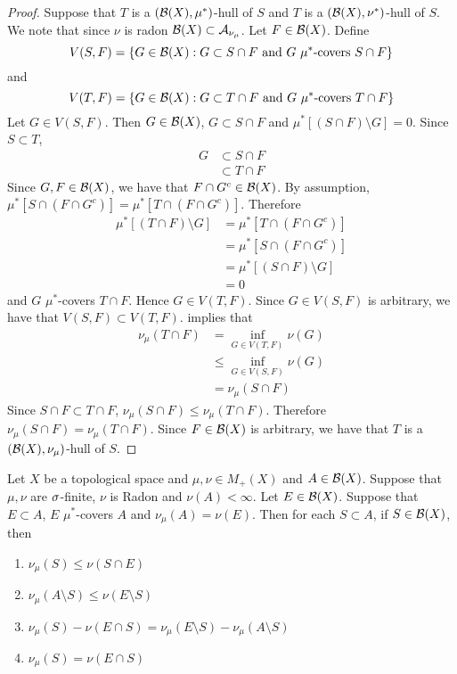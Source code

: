 \documentclass{book}
\begin{document}
	\begin{proof}
		Suppose that $T$ is a $(\mathcal{B}(X), \mu^*)$-hull of $S$ and $T$ is a $(\mathcal{B}(X), \nu^*)$-hull of $S$. We note that since $\nu$ is radon $\mathcal{B}(X) \subset \mathcal{A}_{\nu_{\mu}}$. Let $F \in \mathcal{B}(X)$. Define 
		$$V(S, F) = \{G \in \mathcal{B}(X): G \subset S \cap F \text{ and $G$ $\mu^*$-covers $S \cap F$} \}$$ and 
		$$V(T, F) = \{G \in \mathcal{B}(X): G \subset T \cap F \text{ and $G$ $\mu^*$-covers $T \cap F$} \}$$
		Let $G \in V(S,F)$. Then $G \in \mathcal{B}(X)$, $G \subset S \cap F $ and $\mu^*[(S \cap F) \setminus G] = 0$. Since $S \subset T$, 
		\begin{align*}
			G 
			& \subset S \cap F \\
			& \subset T \cap F
		\end{align*} 
		Since $G, F \in \mathcal{B}(X)$, we have that $F \cap G^c \in \mathcal{B}(X)$. By assumption, $\mu^*[S \cap (F \cap G^c)] = \mu^*[T \cap (F \cap G^c)]$. Therefore
		\begin{align*}
			\mu^*[(T \cap F) \setminus G]
			& = \mu^*[T \cap (F \cap G^c)] \\
			& = \mu^*[S \cap (F \cap G^c)] \\
			& = \mu^*[(S \cap F) \setminus G] \\
			& = 0
		\end{align*}
		and $G$ $\mu^*$-covers $T \cap F$. Hence $G \in V(T, F)$. Since $G \in V(S, F)$ is arbitrary, we have that $ V(S, F) \subset  V(T, F)$.  implies that 
		\begin{align*}
			\nu_{\mu}(T \cap F)
			& = \inf\limits_{G \in V(T, F)} \nu(G) \\
			& \leq \inf\limits_{G \in V(S, F)} \nu(G) \\ 
			& = \nu_{\mu}(S \cap F)
		\end{align*}
		Since $S \cap F \subset T \cap F$, $\nu_{\mu}(S \cap F) \leq \nu_{\mu}(T \cap F)$. Therefore $\nu_{\mu}(S \cap F) = \nu_{\mu}(T \cap F)$. Since $F \in \mathcal{B}(X)$ is arbitrary, we have that $T$ is a $(\mathcal{B}(X), \nu_{\mu})$-hull of $S$. 
	\end{proof}

	\begin{ex} 
		Let $X$ be a topological space and $\mu, \nu \in M_+(X)$ and $A \in \mathcal{B}(X)$. Suppose that $\mu,\nu$ are $\sigma$-finite, $\nu$ is Radon and $\nu(A) < \infty$. Let $E \in \mathcal{B}(X)$. Suppose that $E \subset A$, $E$ $\mu^*$-covers $A$ and $\nu_{\mu}(A) = \nu(E)$. Then for each $S \subset A$, if $S \in \mathcal{B}(X)$, then
		\begin{enumerate}
			\item $\nu_{\mu}(S) \leq \nu(S \cap E)$ 
			\item $\nu_{\mu}(A \setminus S) \leq \nu(E \setminus S)$
			\item $\nu_{\mu}(S) - \nu(E \cap S) = \nu_{\mu}(E \setminus S) - \nu_{\mu}(A \setminus S)$
			\item $\nu_{\mu}(S) = \nu(E \cap S)$
		\end{enumerate} 
	\end{ex}
\end{document}
